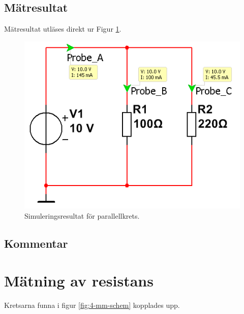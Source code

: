 \documentclass[11pt,a4paper]{article}
\begin{document}
\subsection{Mätresultat}\label{}
Mätresultat utläses direkt ur Figur \ref{fig:sim3}.

\begin{figure}[htbp]
    \centering
    \includegraphics[scale=0.5]{ee466multisim/3.png}
    \caption{Simuleringsresultat för parallellkrets.}
    \label{fig:sim3}
\end{figure}

\subsection{Kommentar}\label{}

\clearpage

\section{Mätning av resistans}\label{}
Kretsarna funna i figur \ref{fig:4-mm-schem} kopplades upp.
\end{document}
